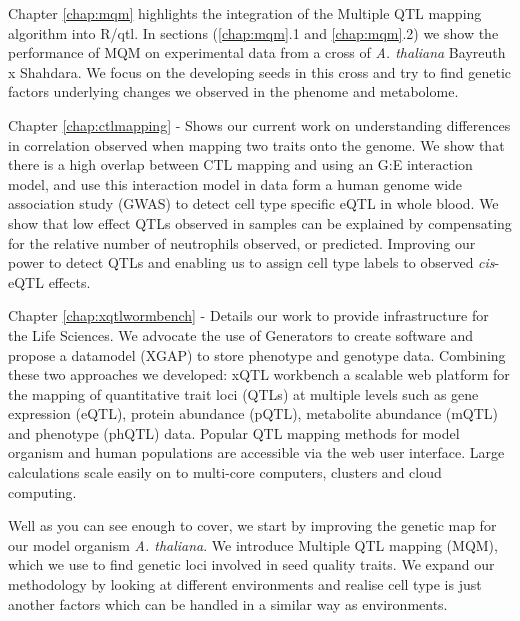 Chapter \ref{chap:mqm} highlights the integration of the Multiple QTL mapping algorithm 
into R/qtl. In sections (\ref{chap:mqm}.1 and  \ref{chap:mqm}.2) we show the performance 
of MQM on experimental data from a cross of \emph{A. thaliana} Bayreuth x Shahdara. We 
focus on the developing seeds in this cross and try to find genetic factors underlying 
changes we observed in the phenome and metabolome.

Chapter \ref{chap:ctlmapping} -  Shows our current work on understanding differences in 
correlation observed when mapping two traits onto the genome. We show that there is a high 
overlap between CTL mapping and using an G:E interaction model, and use this interaction 
model in data form a human genome wide association study (GWAS) to detect cell type specific 
eQTL in whole blood. We show that low effect QTLs observed in samples can be explained by 
compensating for the relative number of neutrophils observed, or predicted. Improving our 
power to detect QTLs and enabling us to assign cell type labels to observed \emph{cis}-eQTL 
effects.

Chapter \ref{chap:xqtlwormbench} - Details our work to provide infrastructure for the Life 
Sciences. We advocate the use of Generators to create software and propose a datamodel (XGAP) 
to store phenotype and genotype data. Combining these two approaches we developed: xQTL 
workbench a scalable web platform for the mapping of quantitative trait loci (QTLs) at 
multiple levels such as gene expression (eQTL), protein abundance (pQTL), metabolite 
abundance (mQTL) and phenotype (phQTL) data. Popular QTL mapping methods for model organism 
and human populations are accessible via the web user interface. Large calculations scale 
easily on to multi-core computers, clusters and cloud computing.

Well as you can see enough to cover, we start by improving the genetic map for our model organism 
\emph{A. thaliana}. We introduce Multiple QTL mapping (MQM), which we use to find genetic loci 
involved in seed quality traits. We expand our methodology by looking at different environments 
and realise cell type is just another factors which can be handled in a similar way as environments.

